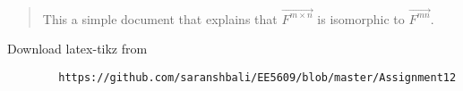 \documentclass[journal,12pt,twocolumn]{IEEEtran}
\begin{document}
	\maketitle
	\newpage
	\bigskip
	\renewcommand{\thefigure}{\theenumi}
	\renewcommand{\thetable}{\theenumi}
	\begin{abstract}
		This a simple document that explains that $\vec{F^{m\times n}}$ is isomorphic to $\vec{F^{mn}}$.
	\end{abstract}
	Download latex-tikz from
	\begin{lstlisting}
		https://github.com/saranshbali/EE5609/blob/master/Assignment12
	\end{lstlisting}
\end{document}
